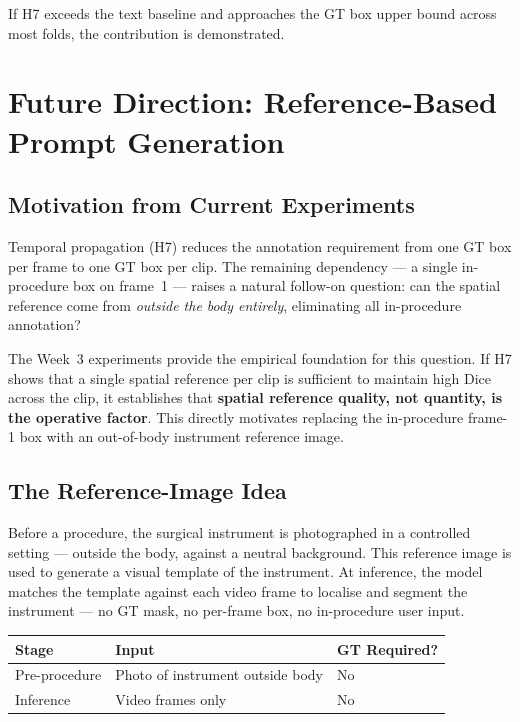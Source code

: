 \documentclass[11pt, a4paper]{article}
\begin{document}
\noindent If H7 exceeds the text baseline and approaches the GT box upper bound
across most folds, the contribution is demonstrated.

\section{Future Direction: Reference-Based Prompt Generation}

\subsection{Motivation from Current Experiments}

Temporal propagation (H7) reduces the annotation requirement from one GT box
per frame to one GT box per clip.
The remaining dependency --- a single in-procedure box on frame~1 --- raises
a natural follow-on question: can the spatial reference come from
\textit{outside the body entirely}, eliminating all in-procedure annotation?

The Week~3 experiments provide the empirical foundation for this question.
If H7 shows that a single spatial reference per clip is sufficient to maintain
high Dice across the clip, it establishes that \textbf{spatial reference
quality, not quantity, is the operative factor}.
This directly motivates replacing the in-procedure frame-1 box with an
out-of-body instrument reference image.

\subsection{The Reference-Image Idea}

Before a procedure, the surgical instrument is photographed in a controlled
setting --- outside the body, against a neutral background.
This reference image is used to generate a visual template of the instrument.
At inference, the model matches the template against each video frame to
localise and segment the instrument --- no GT mask, no per-frame box,
no in-procedure user input.

\begin{center}
\begin{tabular}{lll}
\toprule
\textbf{Stage} & \textbf{Input} & \textbf{GT Required?} \\
\midrule
Pre-procedure  & Photo of instrument outside body & No \\
Inference      & Video frames only                & No \\
\bottomrule
\end{tabular}
\end{center}
\end{document}
